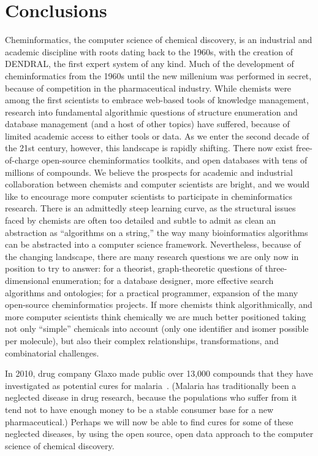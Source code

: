 \documentclass{sig-alternate}
\begin{document}
\section{Conclusions}
\label{sec:conclusions}
Cheminformatics, the computer science of chemical discovery, is an
industrial and academic discipline with roots dating back to the
1960s, with the creation of DENDRAL, the first expert system of any
kind.  Much of the development of cheminformatics from the 1960s until
the new millenium was performed in secret, because of competition in
the pharmaceutical industry.  While chemists were among the first
scientists to embrace web-based tools of knowledge management,
research into fundamental algorithmic questions of structure
enumeration and database management (and a host of other topics) have
suffered, because of limited academic access to either tools or data.
As we enter the second decade of the 21st century, however, this
landscape is rapidly shifting.  There now exist free-of-charge
open-source cheminformatics toolkits, and open databases with tens of
millions of compounds.  We believe the prospects for academic and
industrial collaboration between chemists and computer scientists are
bright, and we would like to encourage more computer scientists to
participate in cheminformatics research.  There is an admittedly steep
learning curve, as the structural issues faced by chemists are often
too detailed and subtle to admit as clean an abstraction as
``algorithms on a string,'' the way many bioinformatics algorithms can
be abstracted into a computer science framework.  Nevertheless,
because of the changing landscape, there are many research questions
we are only now in position to try to answer: for a theorist,
graph-theoretic questions of three-dimensional enumeration; for a
database designer, more effective search algorithms and ontologies;
for a practical programmer, expansion of the many open-source
cheminformatics projects.  If more chemists think algorithmically, and
more computer scientists think chemically we are much better
positioned taking not only ``simple'' chemicals into account (only one
identifier and isomer possible per molecule), but also their complex
relationships, transformations, and combinatorial challenges.

In 2010, drug company Glaxo made public over 13,000 compounds that
they have investigated as potential cures for
malaria~\cite{glaxo-malaria}.  (Malaria has traditionally been a
neglected disease in drug research, because the populations who suffer
from it tend not to have enough money to be a stable consumer base for
a new pharmaceutical.)  Perhaps we will now be able to find cures for
some of these neglected diseases, by using the open source, open data
approach to the computer science of chemical discovery.
\end{document}
